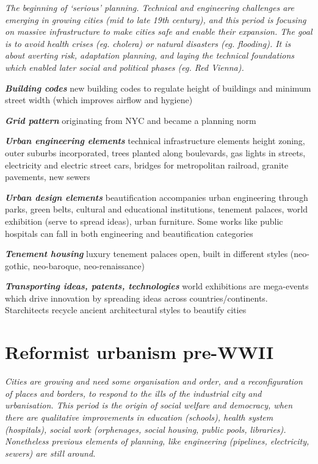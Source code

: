 \documentclass{article}
\newcommand{\bisection}[1]{\textbf{\textit{#1}}}
\newcommand{\alignedmarginpar}[1]{%
        \marginpar{\raggedright\small #1}
    }
\begin{document}
\textit{The beginning of `serious' planning. Technical and engineering challenges are emerging in growing cities (mid to late 19th century), and this period is focusing on massive infrastructure to make cities safe and enable their expansion. The goal is to avoid health crises (eg. cholera) or natural disasters (eg. flooding). It is about averting risk, adaptation planning, and laying the technical foundations which enabled later social and political phases (eg. Red Vienna).}

\bisection{Building codes} new building codes to regulate height of buildings and minimum street width (which improves airflow and hygiene)

\bisection{Grid pattern} originating from NYC and became a planning norm

\bisection{Urban engineering elements} technical infrastructure elements height zoning, outer suburbs incorporated, trees planted along boulevards, gas lights in streets, electricity and electric street cars, bridges for metropolitan railroad, granite pavements, new sewers

\bisection{Urban design elements}\alignedmarginpar{Ringstrasse} beautification accompanies urban engineering through parks, green belts, cultural and educational institutions, tenement palaces, world exhibition (serve to spread ideas), urban furniture. Some works like public hospitals can fall in both engineering and beautification categories

\bisection{Tenement housing} luxury tenement palaces open, built in different styles (neo-gothic, neo-baroque, neo-renaissance)

\bisection{Transporting ideas, patents, technologies}\alignedmarginpar{corrugated iron} world exhibitions are mega-events which drive innovation by spreading ideas across countries/continents. Starchitects recycle ancient architectural styles to beautify cities\alignedmarginpar{Athens in Vienna}

\pagebreak
\section{Reformist urbanism pre-WWII}

\textit{Cities are growing and need some organisation and order, and a reconfiguration of places and borders, to respond to the ills of the industrial city and urbanisation. This period is the origin of social welfare and democracy, when there are qualitative improvements in education (schools), health system (hospitals), social work (orphenages, social housing, public pools, libraries). Nonetheless previous elements of planning, like engineering (pipelines, electricity, sewers) are still around.}
\end{document}
